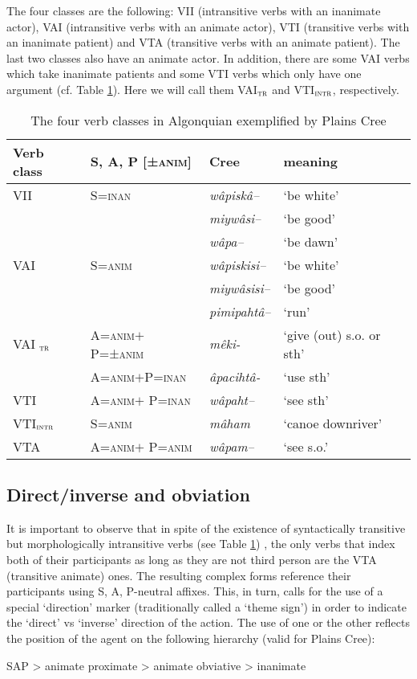 \documentclass[twoside,a4paper,11pt]{article}
\newcommand{\ipa}[1]{{\phon\textit{#1}}}
\newcommand{\anim}{\textsc{anim}}
\newcommand{\inan}{\textsc{inan}}
\newcommand{\intr}{\textsc{intr}}
\newcommand{\tr}{\textsc{tr}}
\begin{document}
The four classes are the following: VII (intransitive verbs with an inanimate actor), VAI (intransitive verbs with an animate actor), VTI (transitive verbs with an inanimate patient) and VTA (transitive verbs with an animate patient). The last two classes also have an animate actor. In addition, there are some  VAI verbs which take inanimate patients and some VTI verbs which only have one argument (cf. Table \ref{tab:verbclass}). Here we will call them VAI$_\tr$ and VTI$_\intr$, respectively.

\begin{table}[htbp]
\caption{The four verb classes in Algonquian exemplified by Plains Cree} \label{tab:verbclass} \centering
\begin{tabular}{llll}
\toprule
Verb class & S, A, P [±\anim] & Cree & meaning\\
\midrule
VII & S=\inan &\ipa{wâpiskâ--} & `be white'\\
& & \ipa{miywâsi--} & `be good' \\
& &\ipa{wâpa--} & `be dawn'\\
VAI & S=\anim & \ipa{wâpiskisi--} & `be white'\\
& &\ipa{miywâsisi--} & `be good'\\
& & \ipa{pimipahtâ--} & `run'\\
VAI $_\tr$ & A=\anim$+$P=±\anim & \ipa{mêki-} & `give (out) s.o. or sth'\\
& A=\anim$+$P=\inan & \ipa{âpacihtâ-} &`use sth'\\
VTI & A=\anim$+$ P=\inan & \ipa{wâpaht--} & `see sth'\\
VTI$_\intr$& S=\anim & \ipa{mâham} & `canoe downriver'\\
VTA & A=\anim$+$ P=\anim & \ipa{wâpam--}& `see s.o.'\\
\bottomrule
\end{tabular}
\end{table}

\subsection{Direct/inverse and obviation}

It is important to observe that in spite of the existence of syntactically transitive but morphologically intransitive verbs (see Table \ref{tab:verbclass}) , the only verbs that index both of their participants as long as they are not third person are the VTA (transitive animate) ones. The resulting complex forms reference their participants using S, A, P-neutral affixes. This, in turn, calls for the use of a special `direction' marker (traditionally called a `theme sign') in order to indicate the `direct' vs `inverse' direction of the action. The use of one or the other reflects the position of the agent on the following hierarchy (valid for Plains Cree):
\begin{exe}
\ex \label{ex:empathy.cree}
\glt SAP > animate proximate > animate obviative > inanimate
\end{exe}
\end{document}
